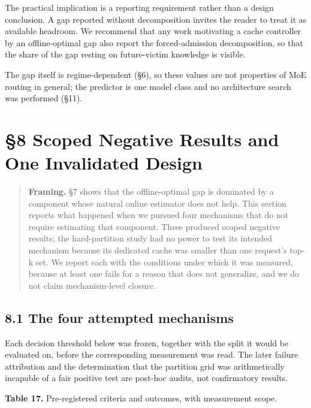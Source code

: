 \documentclass[
  10pt,
  letterpaper,
  10pt]{article}
\begin{document}
The practical implication is a reporting requirement rather than a
design conclusion. A gap reported without decomposition invites the
reader to treat it as available headroom. We recommend that any work
motivating a cache controller by an offline-optimal gap also report the
forced-admission decomposition, so that the share of the gap resting on
future-victim knowledge is visible.

The gap itself is regime-dependent (§6), so these values are not
properties of MoE routing in general; the predictor is one model class
and no architecture search was performed (§11).

\section{§8 Scoped Negative Results and One Invalidated
Design}\label{scoped-negative-results-and-one-invalidated-design}

\begin{quote}
\textbf{Framing.} §7 shows that the offline-optimal gap is dominated by
a component whose natural online estimator does not help. This section
reports what happened when we pursued four mechanisms that do not
require estimating that component. Three produced scoped negative
results; the hard-partition study had no power to test its intended
mechanism because its dedicated cache was smaller than one request's
top-k set. We report each with the conditions under which it was
measured, because at least one fails for a reason that does not
generalize, and we do not claim mechanism-level closure.
\end{quote}

\subsection{8.1 The four attempted
mechanisms}\label{the-four-attempted-mechanisms}

Each decision threshold below was frozen, together with the split it
would be evaluated on, before the corresponding measurement was read.
The later failure attribution and the determination that the partition
grid was arithmetically incapable of a fair positive test are post-hoc
audits, not confirmatory results.

\textbf{Table 17.} Pre-registered criteria and outcomes, with
measurement scope.
\end{document}
